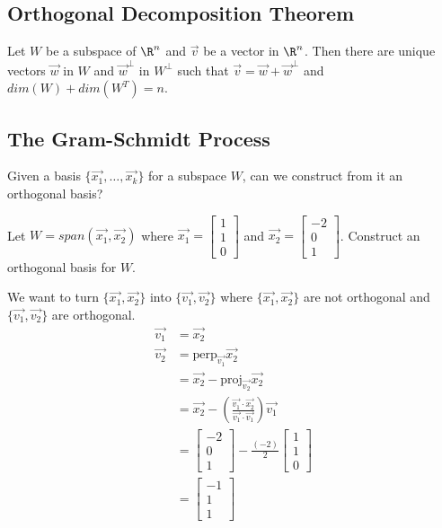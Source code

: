 \documentclass{math}
\begin{document}
\subsection*{Orthogonal Decomposition Theorem}
Let \( W \) be a subspace of \( \R^n \) and \( \vec{v} \) be a vector in
\( \R^n \). Then there are unique vectors \( \vec{w} \) in \( W \) and
\( \vec{w}^{\bot} \) in \( W^{\bot} \) such that \( \vec{v} =
\vec{w}+\vec{w}^{\bot} \) and \( dim(W)+dim(W^T) = n \).

\subsection*{The Gram-Schmidt Process}
Given a basis \( \{\vec{x_1},\dots,\vec{x_k}\} \) for a subspace \( W \), can we
construct from it an orthogonal basis? \par
Let \( W = span(\vec{x_1},\vec{x_2}) \) where \( \vec{x_1} = \begin{bmatrix}
1 \\ 1 \\ 0\end{bmatrix} \) and \( \vec{x_2} = \begin{bmatrix}-2 \\ 0 \\
1\end{bmatrix} \). Construct an orthogonal basis for \( W \). \par
We want to turn \( \{\vec{x_1},\vec{x_2}\} \) into \( \{\vec{v_1},\vec{v_2}\} \)
where \( \{\vec{x_1},\vec{x_2}\} \) are not orthogonal and
\( \{\vec{v_1},\vec{v_2}\} \) are orthogonal.
\begin{align*}
  \vec{v_1} &= \vec{x_2} \\
  \vec{v_2} &= \text{perp}_{\vec{v_1}}\vec{x_2} \\
  &= \vec{x_2}-\text{proj}_{\vec{v_2}}\vec{x_2} \\
  &= \vec{x_2}-\left(\frac{\vec{v_1}\cdot\vec{x_2}}{\vec{v_1}\cdot\vec{v_1}}
    \right)\vec{v_1} \\
  &= \begin{bmatrix}-2 \\ 0 \\ 1\end{bmatrix}-\frac{(-2)}{2}\begin{bmatrix}
    1 \\ 1 \\ 0\end{bmatrix} \\
  &= \begin{bmatrix}-1 \\ 1 \\ 1\end{bmatrix}
\end{align*}
\end{document}
